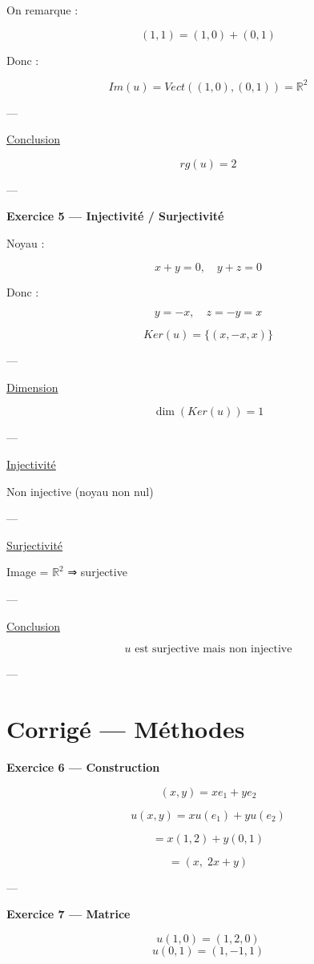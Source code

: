 \documentclass[11pt,a4paper]{article}
\begin{document}
On remarque :

\[
(1,1) = (1,0) + (0,1)
\]

Donc :

\[
Im(u) = Vect((1,0),(0,1)) = \mathbb{R}^2
\]

---

\underline{Conclusion}

\[
rg(u) = 2
\]

---

\textbf{Exercice 5 — Injectivité / Surjectivité}

Noyau :

\[
x+y=0,\quad y+z=0
\]

Donc :

\[
y = -x,\quad z = -y = x
\]

\[
Ker(u) = \{(x,-x,x)\}
\]

---

\underline{Dimension}

\[
\dim(Ker(u)) = 1
\]

---

\underline{Injectivité}

Non injective (noyau non nul)

---

\underline{Surjectivité}

Image = $\mathbb{R}^2$ ⇒ surjective

---

\underline{Conclusion}

\[
u \text{ est surjective mais non injective}
\]

---

\section{Corrigé — Méthodes}

\textbf{Exercice 6 — Construction}

\[
(x,y) = x e_1 + y e_2
\]

\[
u(x,y) = x u(e_1) + y u(e_2)
\]

\[
= x(1,2) + y(0,1)
\]

\[
= (x,\; 2x+y)
\]

---

\textbf{Exercice 7 — Matrice}

\[
u(1,0) = (1,2,0)
\]
\[
u(0,1) = (1,-1,1)
\]
\end{document}
